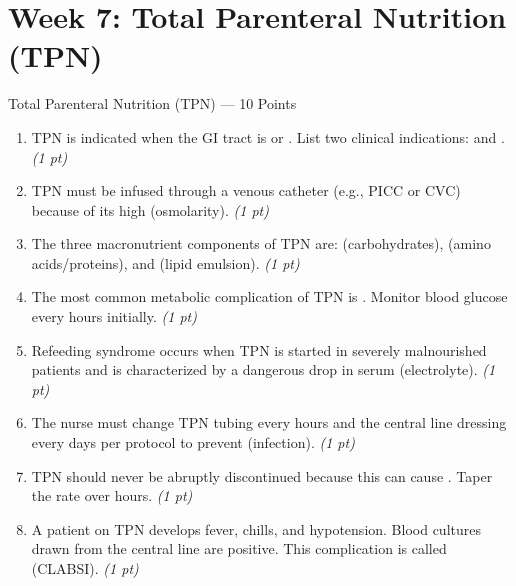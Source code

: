 \documentclass[11pt,letterpaper]{article}
\newcommand{\blank}[1][3cm]{\underline{\hspace{#1}}}
\begin{document}
\newpage

\section{Week 7: Total Parenteral Nutrition (TPN)}

\begin{diagbox}{Total Parenteral Nutrition (TPN) --- 10 Points}

\begin{enumerate}[leftmargin=1.5em, label=\textbf{\arabic*.},start=51]

  \item TPN is indicated when the GI tract is \blank[4cm] or
        \blank[4cm].  List two clinical indications:
        \blank[4cm] and \blank[4cm].
        \hfill\textit{(1 pt)}

  \item TPN must be infused through a \blank[3cm] venous catheter (e.g.,
        PICC or CVC) because of its high \blank[3cm] (osmolarity).
        \hfill\textit{(1 pt)}

  \item The three macronutrient components of TPN are: \blank[2cm]
        (carbohydrates), \blank[2cm] (amino acids/proteins), and
        \blank[3cm] (lipid emulsion).
        \hfill\textit{(1 pt)}

  \item The most common metabolic complication of TPN is
        \blank[3cm].  Monitor blood glucose every \blank[2cm] hours
        initially.
        \hfill\textit{(1 pt)}

  \item Refeeding syndrome occurs when TPN is started in severely malnourished
        patients and is characterized by a dangerous drop in serum
        \blank[2.5cm] (electrolyte).
        \hfill\textit{(1 pt)}

  \item The nurse must change TPN tubing every \blank[2cm] hours and the
        central line dressing every \blank[2cm] days per protocol to prevent
        \blank[3cm] (infection).
        \hfill\textit{(1 pt)}

  \item TPN should never be abruptly discontinued because this can cause
        \blank[4cm].  Taper the rate over \blank[2cm] hours.
        \hfill\textit{(1 pt)}

  \item A patient on TPN develops fever, chills, and hypotension.  Blood cultures
        drawn from the central line are positive.  This complication is called
        \blank[4cm] (CLABSI).
        \hfill\textit{(1 pt)}


\end{enumerate}
\end{diagbox}
\end{document}
